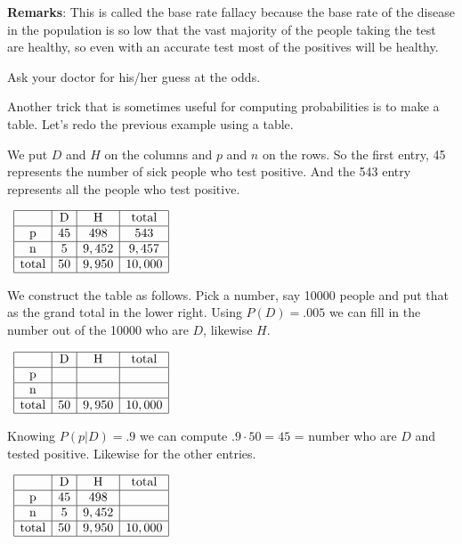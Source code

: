 \textbf{Remarks}: This is called the base rate fallacy because 
the base rate of the disease in the population is so low that the vast
majority of the people taking the test are healthy, so even with an
accurate test most of the positives will be healthy.

Ask your doctor for his/her guess at the odds.

\cont

Another trick that is sometimes useful for computing probabilities is
to make a table. Let's redo the previous example using a table.

\parbox[t]{5in}{
We put $D$ and $H$ on the columns and $p$ and $n$
on the rows. So the first entry, 45 represents the number of 
sick people who test positive. And
the 543 entry represents all the people who test positive.
}
\parbox[t]{1.5in}{
\, 
$\begin{array}{|c|c|c|c|}
\hline
&           \textrm{D} & \textrm{H} & \textrm{total}\\
\hline
\textrm{p} &     45    &      498   &       543\\
\hline
\textrm{n} &      5    &    9,452   &     9,457\\
\hline
\textrm{total} & 50    &    9,950   &    10,000\\
\hline
\end{array}$
}

\parbox[t]{5in}{
We construct the table as follows. Pick a number, say 10000 people and
put that as the grand total in the lower right. Using $P(D) = .005$
we can fill in the number out of the 10000 who are $D$, likewise $H$.
}
\parbox[t]{1.5in}{
\,
$\begin{array}{|c|c|c|c|}
\hline
&           \textrm{D} & \textrm{H} & \textrm{total}\\
\hline
\textrm{p} &         &         &       \\
\hline
\textrm{n} &          &       &     \\
\hline
\textrm{total} & 50    &    9,950   &    10,000\\
\hline
\end{array}$
}

\parbox[t]{5in}{
Knowing $P(p|D)=.9$ we can compute $.9\cdot 50 = 45$ = number who are $D$ and 
tested positive. Likewise for the other entries.
}
\parbox[t]{1.5in}{
\,
$\begin{array}{|c|c|c|c|}
\hline
&           \textrm{D} & \textrm{H} & \textrm{total}\\
\hline
\textrm{p} &     45    &      498   &       \\
\hline
\textrm{n} &      5    &    9,452   &     \\
\hline
\textrm{total} & 50    &    9,950   &    10,000\\
\hline
\end{array}$
}

